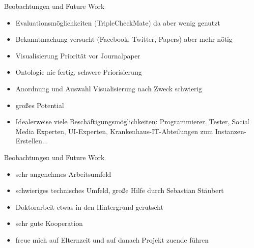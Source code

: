 \documentclass{beamer}
\begin{document}
\begin{frame}{Beobachtungen und Future Work}
\begin{itemize}
\item Evaluationsmöglichkeiten (TripleCheckMate) da aber wenig genutzt
\item Bekanntmachung versucht (Facebook, Twitter, Papers) aber mehr nötig
\item Visualisierung Priorität vor Journalpaper 
\item Ontologie nie fertig, schwere Priorisierung
\item Anordnung und Auswahl Visualisierung nach Zweck schwierig
\item großes Potential
\item Idealerweise viele Beschäftigungsmöglichkeiten: Programmierer, Tester, Social Media Experten, UI-Experten, Krankenhaus-IT-Abteilungen zum Instanzen-Erstellen$\ldots$
\end{itemize}
\end{frame}

\begin{frame}{Beobachtungen und Future Work}
\begin{itemize}
\item sehr angenehmes Arbeitsumfeld
\item schwieriges technisches Umfeld, große Hilfe durch Sebastian Stäubert
\item Doktorarbeit etwas in den Hintergrund gerutscht
\item sehr gute Kooperation
\item freue mich auf Elternzeit und auf danach Projekt zuende führen
\end{itemize}
\end{frame}
\end{document}
